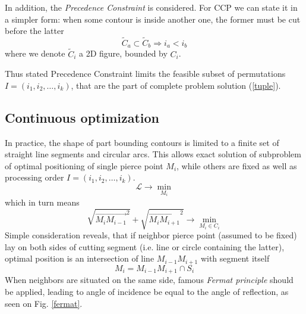 \documentclass{ifacconf}
\begin{document}
In addition,
the \textit{Precedence Constraint}
is considered.
For CCP we can state it in a simpler form:
when some contour is inside another one,
the former must be cut
before the latter
$$
\tilde C_a \subset \tilde C_b
\Rightarrow
i_a < i_b
$$
where we denote
$\tilde C_i$ a 2D figure,
bounded by $C_i$.

Thus stated Precedence Constraint
limits the feasible subset of permutations
$I=(i_1, i_2, \dots, i_k)$,
that are the part of
complete problem solution (\ref{tuple}).

\subsection{Continuous optimization}
In practice,
the shape of part bounding contours
is limited to a finite set
of straight line segments and circular arcs.
This allows exact solution of
subproblem of optimal
positioning of single pierce point $M_i$,
while others are fixed as well as
processing order
$I=(i_1, i_2, \dots, i_k)$.
$$
\mathcal L \to \min_{M_i}
$$
which in turn means
$$
\sqrt{\overrightarrow{M_i M_{i-1}}^2} +
\sqrt{\overrightarrow{M_i M_{i+1}}^2} \to
\min_{M_i \in C_i}
$$
Simple consideration reveals,
that
if neighbor pierce
point (assumed to be fixed)
lay on both sides of cutting segment
(i.e. line or circle containing the latter),
optimal position is an
intersection of line $M_{i-1}M_{i+1}$
with segment itself
$$
M_i = M_{i-1}M_{i+1} \cap S_i
$$
When neighbors are situated
on the same side,
famous \textit{Fermat principle}
should be applied,
leading to
angle of incidence be equal to the angle of reflection,
as seen on Fig. \ref{fermat}.
\end{document}
